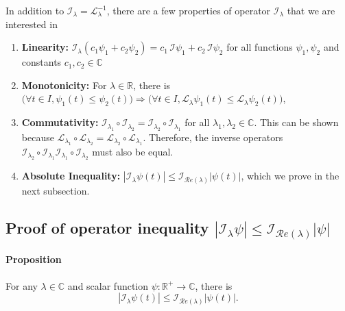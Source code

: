 \documentclass[]{uai2023}
\renewcommand{\L}{\mathcal{L}}
\newcommand{\I}{\mathcal{I}}
\renewcommand{\Re}[1]{\mathcal{R}e\left(#1\right)}
\begin{document}
    In addition to $\I_{\lambda} = \L^{-1}_{\lambda}$, there are a few properties of operator $\I_{\lambda}$ that we are interested in
    \begin{enumerate}
        \item \textbf{Linearity:} $\I_{\lambda} (c_1\psi_1 + c_2\psi_2) = c_1\,\I\psi_1 + c_2\,\I\psi_2$ for all functions $\psi_1, \psi_2$ and constants $c_1, c_2 \in \mathbb{C}$
        \item \textbf{Monotonicity:} For $\lambda\in \mathbb{R}$, there is $\big(\forall t\in I, \psi_1(t) \leq \psi_2(t) \big) \Longrightarrow\big(\forall t \in I, \L_{\lambda}\psi_1(t) \leq \L_{\lambda}\psi_2(t)\big)$,
        \item \textbf{Commutativity:} $\I_{\lambda_1} \circ \I_{\lambda_2} = \I_{\lambda_2} \circ \I_{\lambda_1} $ for all $\lambda_1, \lambda_2 \in \mathbb{C}$. This can be shown because $\L_{\lambda_1}\circ\L_{\lambda_2} = \L_{\lambda_2} \circ \L_{\lambda_1}$. Therefore, the inverse operators $\I_{\lambda_2} \circ \I_{\lambda_1} \I_{\lambda_1}\circ\I_{\lambda_2}$ must also be equal.
        \item \textbf{Absolute Inequality:} $|\I_\lambda \psi(t)| \leq \I_{\Re{\lambda}}|\psi(t)|$, which we prove in the next subsection.
    \end{enumerate}

\subsection{Proof of operator inequality $|\I_\lambda \psi| \leq \I_{\Re{\lambda}}|\psi|$}
    \paragraph{Proposition} For any $\lambda \in \mathbb{C}$ and scalar function $\psi: \mathbb{R}^{+} \to \mathbb{C}$, there is 
    \begin{equation}\label{eq:operator-I-inequality}
        |\I_\lambda \psi(t)| \leq \I_{\Re{\lambda}}|\psi(t)|.
    \end{equation}
\end{document}
